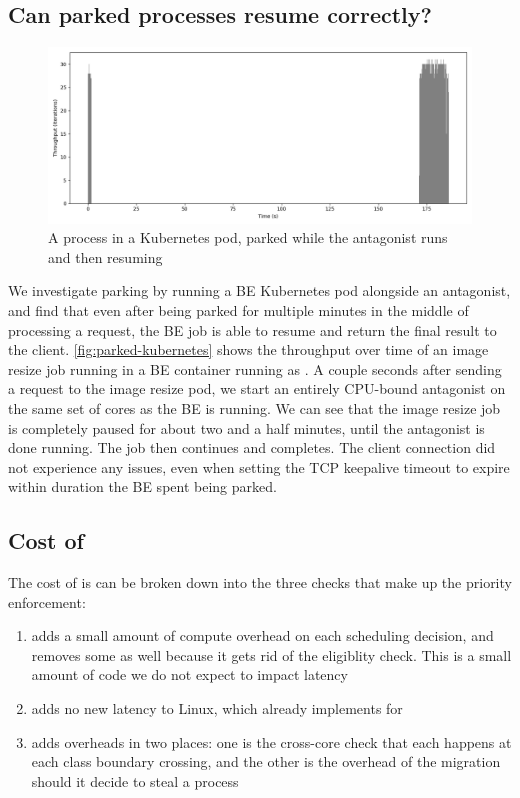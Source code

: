 \subsection{Can parked processes resume correctly?}\label{ss:eval:parking}


\begin{figure}[t]
    \centering
    \includegraphics[width=\columnwidth]{graphs/parked-kubernetes.png}
    \caption{A \beclass{} process in a Kubernetes pod, parked while the
    antagonist runs and then resuming}\label{fig:parked-kubernetes}
\end{figure}

We investigate parking by running a BE Kubernetes pod alongside an antagonist,
and find that even after being parked for multiple minutes in the middle of
processing a request, the BE job is able to resume and return the final result
to the client. \autoref{fig:parked-kubernetes} shows the throughput over time of
an image resize job running in a BE container running as \schedbe{}. A couple
seconds after sending a request to the image resize pod, we start an entirely
CPU-bound antagonist on the same set of cores as the BE is running. We can see
that the image resize job is completely paused for about two and a half minutes,
until the antagonist is done running. The job then continues and completes. The
client connection did not experience any issues, even when setting the TCP
keepalive timeout to expire within duration the BE spent being parked.



\subsection{Cost of \schedbe{}}

The cost of \schedbe{} is can be broken down into the three checks that make up
the priority enforcement:

\begin{enumerate}
    \item \local{} adds a small amount of compute overhead on each scheduling
    decision, and removes some as well because it gets rid of the eligiblity
    check. This is a small amount of code we do not expect to impact latency
    \item \entry{} adds no new latency to Linux, which already implements
    \entry{} for \schedidle{}
    \item \exit{} adds overheads in two places: one is the cross-core check that
    each happens at each class boundary crossing, and the other is the overhead
    of the migration should it decide to steal a \schednormal{} process
\end{enumerate}

